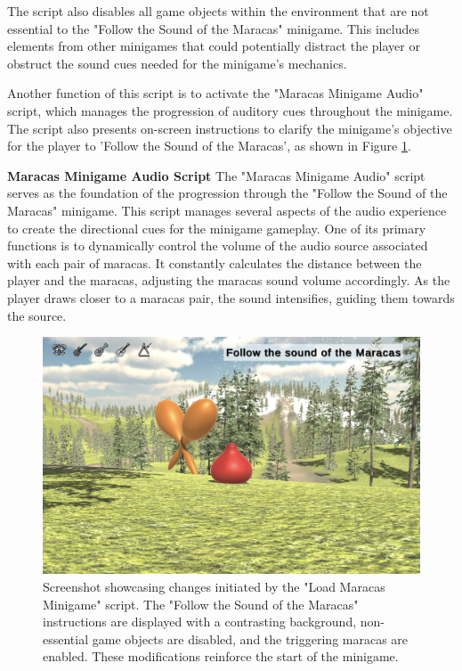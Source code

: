 \documentclass{l4proj}
\begin{document}
The script also disables all game objects within the environment that are not essential to the "Follow the Sound of the Maracas" minigame. This includes elements from other minigames that could potentially distract the player or obstruct the sound cues needed for the minigame's mechanics.

Another function of this script is to activate the "Maracas Minigame Audio" script, which manages the progression of auditory cues throughout the minigame. The script also presents on-screen instructions to clarify the minigame's objective for the player to 'Follow the Sound of the Maracas', as shown in Figure \ref{fig:maracas_setup}.

\textbf{Maracas Minigame Audio Script} \newline
The "Maracas Minigame Audio" script serves as the foundation of the progression through the "Follow the Sound of the Maracas" minigame. This script manages several aspects of the audio experience to create the directional cues for the minigame gameplay. One of its primary functions is to dynamically control the volume of the audio source associated with each pair of maracas. It constantly calculates the distance between the player and the maracas, adjusting the maracas sound volume accordingly. As the player draws closer to a maracas pair, the sound intensifies, guiding them towards the source.

\begin{figure}[h]
 \centering
 \includegraphics[width=0.7\linewidth]{dissertation/images/Maracas_Setup.png} 
 \caption{Screenshot showcasing changes initiated by the "Load Maracas Minigame" script. The "Follow the Sound of the Maracas" instructions are displayed with a contrasting background, non-essential game objects are disabled, and the triggering maracas are enabled. These modifications reinforce the start of the minigame.} 
 \label{fig:maracas_setup} 
\end{figure}
\end{document}
